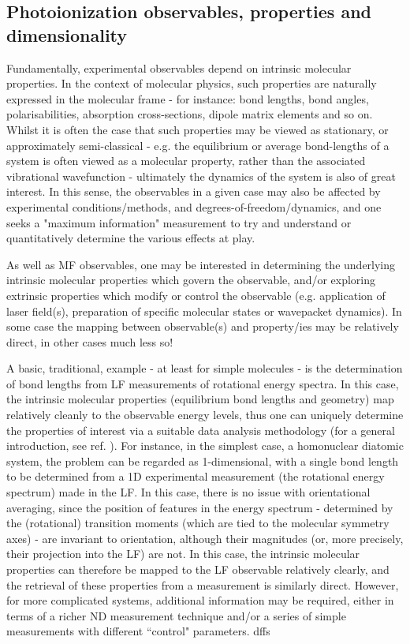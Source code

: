 \subsection{Photoionization observables, properties and dimensionality\label{sec:Photo-into}}

Fundamentally, experimental observables depend on intrinsic molecular properties. In the  context of molecular physics, such properties are naturally expressed in the molecular frame - for instance: bond lengths, bond angles, polarisabilities, absorption cross-sections, dipole matrix elements and so on. Whilst it is often the case that such properties may be viewed as stationary, or approximately semi-classical - e.g. the equilibrium or average bond-lengths of a system is often viewed as a molecular property, rather than the associated vibrational wavefunction - ultimately the dynamics of the system is also of great interest. In this sense, the observables in a given case may also be affected by experimental conditions/methods, and degrees-of-freedom/dynamics, and one seeks a "maximum information" measurement to try and understand or quantitatively determine the various effects at play.

As well as MF observables, one may be interested in determining the underlying intrinsic molecular properties which govern the observable, and/or exploring extrinsic properties which modify or control the observable (e.g. application of laser field(s), preparation of specific molecular states or wavepacket dynamics). In some case the mapping between observable(s) and property/ies may be relatively direct, in other cases much less so!

A basic, traditional, example - at least for simple molecules - is the determination of bond lengths from LF measurements of rotational energy spectra. In this case, the intrinsic molecular properties (equilibrium bond lengths and geometry) map relatively cleanly to the observable energy levels, thus one can uniquely determine the properties of interest via a suitable data analysis methodology (for a general introduction, see ref. \cite{hollasHighRes}). For instance, in the simplest case, a homonuclear diatomic system, the problem can be regarded as 1-dimensional, with a single bond length to be determined from a 1D experimental measurement (the rotational energy spectrum) made in the LF. In this case, there is no issue with orientational averaging, since the position of features in the energy spectrum - determined by the (rotational) transition moments (which are tied to the molecular symmetry axes) - are invariant to orientation, although their magnitudes (or, more precisely, their projection into the LF) are not. In this case, the intrinsic molecular properties can therefore be mapped to the LF observable relatively clearly, and the retrieval of these properties from a measurement is similarly direct. However, for more complicated systems, additional information may be required, either in terms of a richer ND measurement technique and/or a series of simple measurements with different ``control" parameters.
dffs

